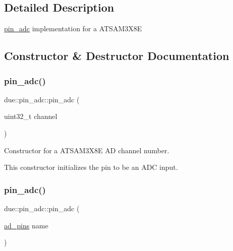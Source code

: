 \subsection{Detailed Description}
\hyperlink{classdue_1_1pin__adc}{pin\+\_\+adc} implementation for a A\+T\+S\+A\+M3\+X8E 

\subsection{Constructor \& Destructor Documentation}
\mbox{\label{classdue_1_1pin__adc_a830aea1f1d8f1b538e73ac57ece494c1}} 
\subsubsection{\texorpdfstring{pin\+\_\+adc()}{pin\_adc()}\hspace{0.1cm}{\footnotesize\ttfamily [1/2]}}
{\footnotesize\ttfamily due\+::pin\+\_\+adc\+::pin\+\_\+adc (\begin{DoxyParamCaption}\item[{uint32\+\_\+t}]{channel }\end{DoxyParamCaption})\hspace{0.3cm}{\ttfamily [inline]}}



Constructor for a A\+T\+S\+A\+M3\+X8E AD channel number. 

This constructor initializes the pin to be an A\+DC input. \mbox{\label{classdue_1_1pin__adc_a106bc97a20bb90be8cc0d8d9152d201f}} 
\subsubsection{\texorpdfstring{pin\+\_\+adc()}{pin\_adc()}\hspace{0.1cm}{\footnotesize\ttfamily [2/2]}}
{\footnotesize\ttfamily due\+::pin\+\_\+adc\+::pin\+\_\+adc (\begin{DoxyParamCaption}\item[{\hyperlink{namespacedue_a5ecc98d40585c91eabbfb14f71bd7d4c}{ad\+\_\+pins}}]{name }\end{DoxyParamCaption})\hspace{0.3cm}{\ttfamily [inline]}}



